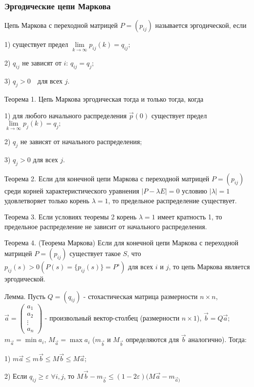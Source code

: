 \subsubsection*{Эргодические цепи Маркова}

Цепь Маркова с переходной матрицей $P = (p_{ij})$ называется эргодической, если

1) существует предел
$\lim\limits_{k \to \infty} p_{ij}(k) = q_{ij};$

2) $q_{ij}$ не зависят от $i$:
$q_{ij} = q_j;$

3)
$q_j > 0 \quad \text{для всех } j.$

Теорема 1. Цепь Маркова эргодическая тогда и только тогда, когда

1) для любого начального распределения $\vec{p}(0)$ существует предел
$\lim\limits_{k \to \infty} p_{j}(k) = q_j;$

2) $q_j$ не зависят от начального распределения;

3) $q_j > 0$ для всех $j$.

Теорема 2. Если для конечной цепи Маркова с переходной матрицей $P=(p_{ij})$ среди корней характеристического уравнения $|P-\lambda E|=0$ условию $|\lambda|=1$ удовлетворяет только корень $\lambda=1$, то предельное распределение существует.

Теорема 3. Если условиях теоремы 2 корень $\lambda=1$ имеет кратность 1, то предельное распределение не зависит от начального распределения.

Теорема 4. (Теорема Маркова) Если для конечной цепи Маркова с переходной матрицей $P=(p_{ij})$ существует такое $S$, что $p_{ij}(s)>0 (P(s)=\{p_{ij}(s)\}=P^s)$ для всех $i$ и $j$, то цепь Маркова является эргодической.

Лемма. Пусть $Q=(q_{ij})$ - стохастическая матрица размерности $n \times n$,
$
	\vec{a} = \begin{pmatrix}
		a_1    \\
		a_2    \\
		\vdots \\
		a_n
	\end{pmatrix}
$ - произвольный вектор-столбец (размерности $n \times 1$), $\vec{b}=Q\vec{a}$; $m_{\vec{a}}=\min a_i$, $M_{\vec{a}}=\max a_i$ ($m_{\vec{b}}$ и $M_{\vec{b}}$ определяются для $\vec{b}$ аналогично).
Тогда:

1) $m\vec{a}\leq m\vec{b} \leq M\vec{b} \leq M\vec{a}$;

2) Если $q_{ij} \geq \varepsilon$ $\forall i,j$, то $M_{}\vec{b}-m_{\vec{b}} \leq  (1-2\varepsilon) (M_{}\vec{a}-m_{\vec{a})}$

